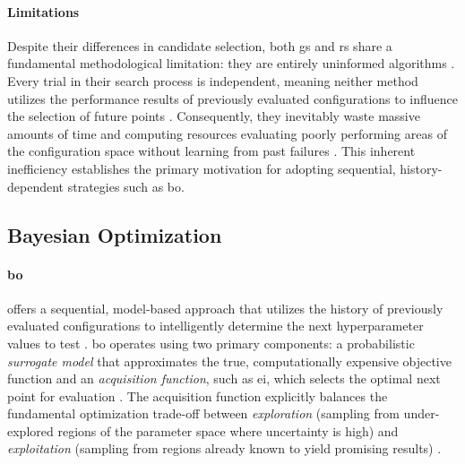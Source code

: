 \paragraph{Limitations}
Despite their differences in candidate selection, both \gls{gs} and \gls{rs} share a fundamental methodological limitation: they are entirely uninformed algorithms \parencite{yangHyperparameterOptimizationMachine2020}. Every trial in their search process is independent, meaning neither method utilizes the performance results of previously evaluated configurations to influence the selection of future points \parencite{yangHyperparameterOptimizationMachine2020}. Consequently, they inevitably waste massive amounts of time and computing resources evaluating poorly performing areas of the configuration space without learning from past failures \parencite{yangHyperparameterOptimizationMachine2020}. This inherent inefficiency establishes the primary motivation for adopting sequential, history-dependent strategies such as \gls{bo}.

\subsection{Bayesian Optimization}
\label{sec:theoretical_bayes}

\paragraph{\acrfull{bo}} offers a sequential, model-based approach that utilizes the history of previously evaluated configurations to intelligently determine the next hyperparameter values to test \parencite{yangHyperparameterOptimizationMachine2020}. \gls{bo} operates using two primary components: a probabilistic \textit{surrogate model} that approximates the true, computationally expensive objective function and an \textit{acquisition function}, such as \gls{ei}, which selects the optimal next point for evaluation \parencite{bergstraAlgorithmsHyperParameterOptimization2011, yangHyperparameterOptimizationMachine2020}. The acquisition function explicitly balances the fundamental optimization trade-off between \textit{exploration} (sampling from under-explored regions of the parameter space where uncertainty is high) and \textit{exploitation} (sampling from regions already known to yield promising results) \parencite{yangHyperparameterOptimizationMachine2020}.

